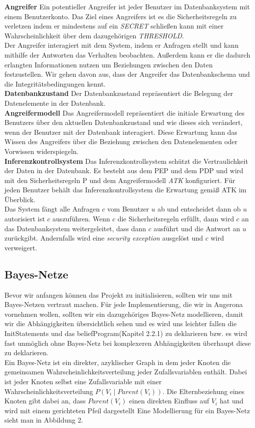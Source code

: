 \documentclass[german,version-2020-11]{uzl-thesis}
\begin{document}
\textbf{Angreifer} Ein potentieller Angreifer ist jeder Benutzer im Datenbanksystem mit einem Benutzerkonto. Das Ziel eines Angreifers ist es die Sicherheitsregeln zu verletzen indem er mindestens auf ein \textit{SECRET} schließen kann mit einer Wahrscheinlichkeit über dem dazugehörigen \textit{THRESHOLD}. \\ Der Angreifer interagiert mit dem System, indem er Anfragen stellt und kann mithilfe der Antworten das Verhalten beobachten. Außerdem kann er die dadurch erlangten Informationen nutzen um Beziehungen zwischen den Daten festzustellen. Wir gehen davon aus, dass der Angreifer das Datenbankschema und die  Integritätsbedingungen kennt. \\
\textbf{Datenbankzustand} Der Datenbankzustand repräsentiert die Belegung der Datenelemente in der Datenbank. \\
\textbf{Angreifermodell} Das Angreifermodell repräsentiert die initiale Erwartung des Benutzers über den aktuellen Datenbankzustand und wie dieses sich verändert, wenn der Benutzer mit der Datenbank interagiert. Diese Erwartung kann das Wissen des Angreifers über die Beziehung zwischen den Datenelementen oder Vorwissen widerspiegeln.\\ 
\textbf{Inferenzkontrollsystem} Das Inferenzkontrollsystem schützt die Vertraulichkeit der Daten in der Datenbank. Es besteht aus dem PEP und dem PDP und wird mit den Sicherheitsregeln P und dem Angreifermodell \textit{ATK} konfiguriert. Für jeden Benutzer behält das Inferenzkontrollsystem die Erwartung gemäß ATK im Überblick.  \\
Das System fängt alle Anfragen $c$ vom Benutzer $u$ ab und entscheidet dann ob $u$ autorisiert ist $c$ auszuführen. Wenn $c$ die Sicherheitsregeln erfüllt, dann wird $c$ an das Datenbanksystem weitergeleitet, dass dann $c$ ausführt und die Antwort an $u$ zurückgibt. Andernfalls wird eine \textit{security exception} ausgelöst und $c$ wird verweigert. \cite{6}
\subsection{Bayes-Netze}
Bevor wir anfangen können das Projekt zu initialisieren, sollten wir uns mit Bayes-Netzen vertraut machen. Für jede Implementierung, die wir in Angerona vornehmen wollen, sollten wir ein dazugehöriges Bayes-Netz modellieren, damit wir die Abhängigkeiten übersichtlich sehen und es wird uns leichter fallen die InitStatements und das beliefProgram(Kapitel 2.2.1) zu deklarieren bzw. es wird fast unmöglich ohne Bayes-Netz bei komplexeren Abhängigkeiten überhaupt diese zu deklarieren. \\ 
Ein Bayes-Netz ist ein direkter, azyklischer Graph in dem jeder Knoten die gemeinsamen Wahrscheinlichkeitsverteilung jeder Zufallsvariablen enthält. Dabei ist jeder Knoten selbst eine Zufallsvariable mit einer Wahrscheinlichkeitsverteilung $P(V_i \mid Parent(V_i) )$. Die Elternbeziehung eines Knoten gibt dabei an, dass $Parent(V_i) $ einen direkten Einfluss auf $V_i$ hat und wird  mit einem gerichteten Pfeil dargestellt\cite{3} Eine Modellierung für ein Bayes-Netz sieht man in Abbildung 2. \\ 
\end{document}
